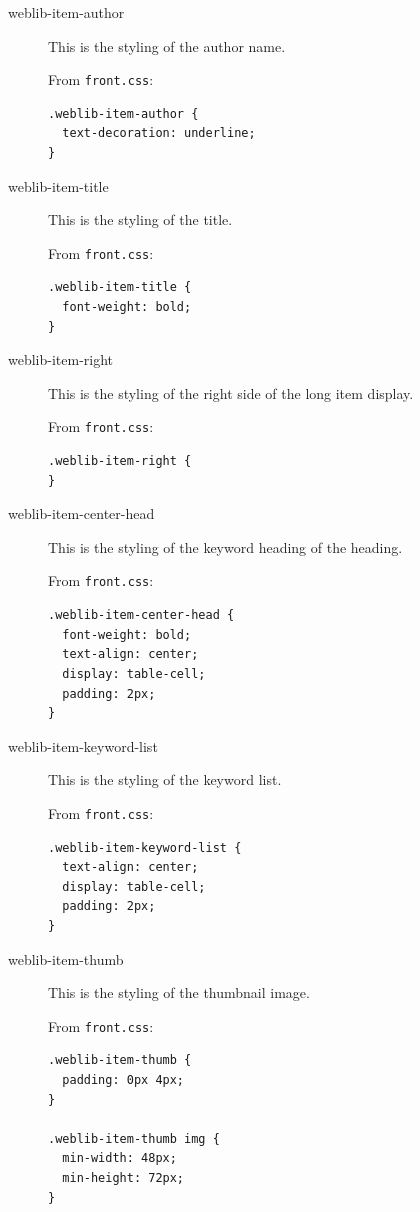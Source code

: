 \documentclass[letterpaper,twoside]{article}
\begin{document}
\begin{description}
\item[weblib-item-author] This is the styling of the author name.

From \texttt{front.css}:

\begin{verbatim}
.weblib-item-author {
  text-decoration: underline;
}
\end{verbatim}

\item[weblib-item-title] This is the styling of the title.

From \texttt{front.css}:

\begin{verbatim}
.weblib-item-title {
  font-weight: bold;
}
\end{verbatim}

\item[weblib-item-right] This is the styling of the right side of the long 
item display.

From \texttt{front.css}:

\begin{verbatim}
.weblib-item-right {
}
\end{verbatim}

\item[weblib-item-center-head] This is the styling of the keyword heading of
the heading.

From \texttt{front.css}:

\begin{verbatim}
.weblib-item-center-head {
  font-weight: bold;
  text-align: center;
  display: table-cell;
  padding: 2px;
}
\end{verbatim}

\item[weblib-item-keyword-list] This is the styling of the keyword list.

From \texttt{front.css}:

\begin{verbatim}
.weblib-item-keyword-list {
  text-align: center;
  display: table-cell;
  padding: 2px;
}
\end{verbatim}

\item[weblib-item-thumb] This is the styling of the thumbnail image.

From \texttt{front.css}:

\begin{verbatim}
.weblib-item-thumb {
  padding: 0px 4px;
}

.weblib-item-thumb img {
  min-width: 48px;
  min-height: 72px;
}
\end{verbatim}


\end{description}
\end{document}
